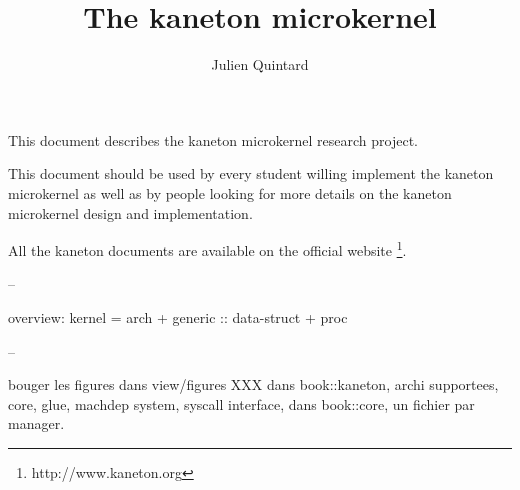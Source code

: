 %
%
%
%
%
%

%
%

\def\path{../..}

%
%



%
%

\rhead{}

%
%

\title{The kaneton microkernel
       \logos}

%
%

\author{\small{Julien Quintard}}

%
%



%
%

\maketitle

%
%

This document describes the kaneton microkernel research project.

This document should be used by every student willing implement the
kaneton microkernel as well as by people looking for more details on the
kaneton microkernel design and implementation.

All the kaneton documents are available on
the official website
  \footnote{http://www.kaneton.org}.

%
%

\tableofcontents

%
%











--

overview: kernel = arch + generic :: data-struct + proc

--

bouger les figures dans view/figures
XXX dans book::kaneton, archi supportees, core, glue, machdep system, syscall
    interface, dans book::core, un fichier par manager.
